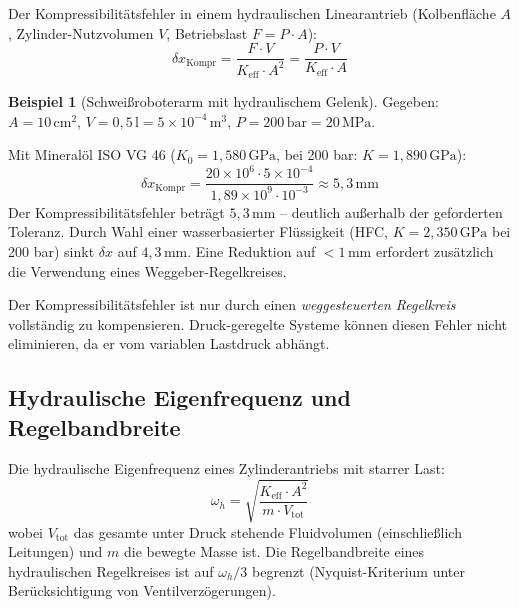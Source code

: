 ﻿\documentclass[a4paper,12pt]{scrreprt}
\theoremstyle{definition}
\newtheorem{beispiel}{Beispiel}[section]
\begin{document}
Der Kompressibilitätsfehler in einem hydraulischen Linearantrieb
(Kolbenfläche $A$, Zylinder-Nutzvolumen $V$, Betriebslast $F = P \cdot A$):
\begin{equation}
  \delta x_{\mathrm{Kompr}} = \frac{F \cdot V}{K_{\mathrm{eff}} \cdot A^2}
    = \frac{P \cdot V}{K_{\mathrm{eff}} \cdot A}
  \label{eq:kompr_fehler}
\end{equation}

\begin{beispiel}[Schweißroboterarm mit hydraulischem Gelenk]
  Gegeben: $A = 10\,\mathrm{cm}^2$, $V = 0{,}5\,\mathrm{l} = 5 \times 10^{-4}\,\mathrm{m}^3$,
  $P = 200\,\mathrm{bar} = 20\,\mathrm{MPa}$.

  Mit Mineralöl ISO VG 46 ($K_0 = 1{,}580\,\mathrm{GPa}$, bei 200 bar:
  $K = 1{,}890\,\mathrm{GPa}$):
  \[
    \delta x_{\mathrm{Kompr}}
      = \frac{20 \times 10^6 \cdot 5 \times 10^{-4}}{1{,}89 \times 10^9 \cdot 10^{-3}}
      \approx 5{,}3\,\mathrm{mm}
  \]
  Der Kompressibilitätsfehler beträgt $5{,}3\,\mathrm{mm}$ -- deutlich
  außerhalb der geforderten Toleranz. Durch Wahl einer wasserbasierter
  Flüssigkeit (HFC, $K = 2{,}350\,\mathrm{GPa}$ bei 200 bar) sinkt
  $\delta x$ auf $4{,}3\,\mathrm{mm}$. Eine Reduktion auf $< 1\,\mathrm{mm}$
  erfordert zusätzlich die Verwendung eines Weggeber-Regelkreises.
\end{beispiel}

Der Kompressibilitätsfehler ist nur durch einen \emph{weggesteuerten Regelkreis}
vollständig zu kompensieren. Druck-geregelte Systeme können diesen Fehler
nicht eliminieren, da er vom variablen Lastdruck abhängt.

\subsection{Hydraulische Eigenfrequenz und Regelbandbreite}

Die hydraulische Eigenfrequenz eines Zylinderantriebs mit starrer Last:
\begin{equation}
  \omega_h = \sqrt{\frac{K_{\mathrm{eff}} \cdot A^2}{m \cdot V_{\mathrm{tot}}}}
  \label{eq:hydraul_eigenfreq}
\end{equation}
wobei $V_{\mathrm{tot}}$ das gesamte unter Druck stehende Fluidvolumen
(einschließlich Leitungen) und $m$ die bewegte Masse ist. Die Regelbandbreite
eines hydraulischen Regelkreises ist auf $\omega_h / 3$ begrenzt (Nyquist-Kriterium
unter Berücksichtigung von Ventilverzögerungen).
\end{document}
